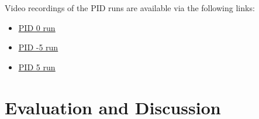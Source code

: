     \vspace{0.25em}\noindent Video recordings of the PID runs are available via the following links:
    \begin{itemize}
        \item \href{https://www.dropbox.com/scl/fo/qydc6hqrx3budknwzgmi1/ADdN0YC3AZ4ctg0SImbJqqI/Videos?preview=final_PID_0.mp4&rlkey=jcnhrcvje207wu5aaq48laen6&subfolder_nav_tracking=1&st=k76cp6vc&dl=0}{\color{blue}\underline{PID 0\textdegree{} run}}
        \item \href{https://www.dropbox.com/scl/fo/qydc6hqrx3budknwzgmi1/ADdN0YC3AZ4ctg0SImbJqqI/Videos?preview=final_PID_neg5.mp4&rlkey=jcnhrcvje207wu5aaq48laen6&subfolder_nav_tracking=1&st=log0nht8&dl=0}{\color{blue}\underline{PID -5\textdegree{} run}}
        \item \href{https://www.dropbox.com/scl/fo/qydc6hqrx3budknwzgmi1/ADdN0YC3AZ4ctg0SImbJqqI/Videos?preview=final_PID_0.mp4&rlkey=jcnhrcvje207wu5aaq48laen6&subfolder_nav_tracking=1&st=k76cp6vc&dl=0}{\color{blue}\underline{PID 5\textdegree{} run}}
    \end{itemize}

\section{Evaluation and Discussion}

